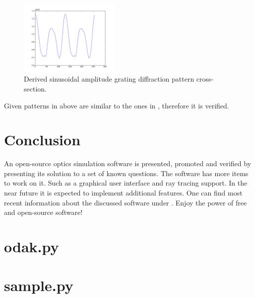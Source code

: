 \documentclass[journal,9pt]{IEEEtran}
\begin{document}
\begin{figure}[H]
\centering
\includegraphics[width=1.9in]{q3s2}
\caption{Derived sinusoidal amplitude grating diffraction pattern cross-section.}
\label{fig:q3s2}
\end{figure}

Given patterns in above are similar to the ones in \cite{goodman2005introduction}, therefore it is verified.
\section{Conclusion}
\label{section:conclusion}
An open-source optics simulation software is presented, promoted and verified by presenting its solution to a set of known questions. The software has more items to work on it. Such as a graphical user interface and ray tracing support. In the near future it is expected to implement additional features. One can find most recent information about the discussed software under \cite{odak}. Enjoy the power of free and open-source software!

\appendices
\section{odak.py}
\label{code:odak}
\lstset{language=Python,breaklines=true}


\section{sample.py}
\label{code:sample}
\lstset{language=Python,breaklines=true}


\ifCLASSOPTIONcaptionsoff
  \newpage
\fi



\end{document}
